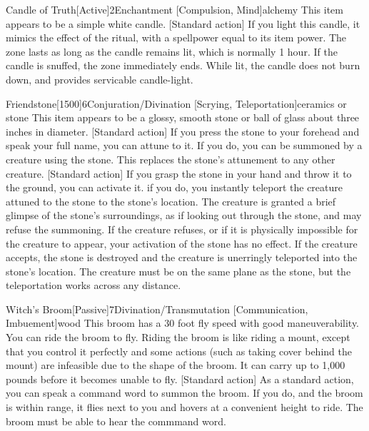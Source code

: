         \begin{magicitemdef}{Candle of Truth}[Active]{2}{Enchantment [Compulsion, Mind]}{alchemy}
            This item appears to be a simple white candle.
            [Standard action] If you light this candle, it mimics the effect of the  ritual, with a spellpower equal to its item power.
            The zone lasts as long as the candle remains lit, which is normally 1 hour.
            If the candle is snuffed, the zone immediately ends.
            While lit, the candle does not burn down, and provides servicable candle-light.
        \end{magicitemdef}

        \begin{magicitemdef}{Friendstone}[1500]{6}{Conjuration/Divination [Scrying, Teleportation]}{ceramics or stone}
            This item appears to be a glossy, smooth stone or ball of glass about three inches in diameter.
            [Standard action] If you press the stone to your forehead and speak your full name, you can attune to it.
            If you do, you can be summoned by a creature using the stone.
            This replaces the stone's attunement to any other creature.
            [Standard action] If you grasp the stone in your hand and throw it to the ground, you can activate it.
            if you do, you instantly teleport the creature attuned to the stone to the stone's location.
            The creature is granted a brief glimpse of the stone's surroundings, as if looking out through the stone, and may refuse the summoning.
            If the creature refuses, or if it is physically impossible for the creature to appear, your activation of the stone has no effect.
            If the creature accepts, the stone is destroyed and the creature is unerringly teleported into the stone's location.
            The creature must be on the same plane as the stone, but the teleportation works across any distance.
        \end{magicitemdef}

        \begin{magicitemdef}{Witch's Broom}[Passive]{7}{Divination/Transmutation [Communication, Imbuement]}{wood}
             This broom has a 30 foot fly speed with good maneuverability.
            You can ride the broom to fly.
            Riding the broom is like riding a mount, except that you control it perfectly and some actions (such as taking cover behind the mount) are infeasible due to the shape of the broom.
            It can carry up to 1,000 pounds before it becomes unable to fly.
            [Standard action] As a standard action, you can speak a command word to summon the broom.
            If you do, and the broom is within \rngext range, it flies next to you and hovers at a convenient height to ride.
            The broom must be able to hear the commmand word.
        \end{magicitemdef}


